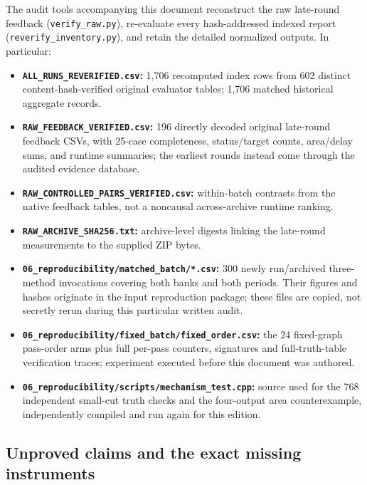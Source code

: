 The audit tools accompanying this document reconstruct the raw late-round feedback (\texttt{verify\_raw.py}), re-evaluate every hash-addressed indexed report (\texttt{reverify\_inventory.py}), and retain the detailed normalized outputs. In particular:

\begin{itemize}
\tightlist
\item
  \textbf{\texttt{ALL\_RUNS\_REVERIFIED.csv}:} 1,706 recomputed index rows from 602 distinct content-hash-verified original evaluator tables; 1,706 matched historical aggregate records.
\item
  \textbf{\texttt{RAW\_FEEDBACK\_VERIFIED.csv}:} 196 directly decoded original late-round feedback CSVs, with 25-case completeness, status/target counts, area/delay sums, and runtime summaries; the earliest rounds instead come through the audited evidence database.
\item
  \textbf{\texttt{RAW\_CONTROLLED\_PAIRS\_VERIFIED.csv}:} within-batch contrasts from the native feedback tables, not a noncausal across-archive runtime ranking.
\item
  \textbf{\texttt{RAW\_ARCHIVE\_SHA256.txt}:} archive-level digests linking the late-round measurements to the supplied ZIP bytes.
\item
  \textbf{\texttt{06\_reproducibility/matched\_batch/*.csv}:} 300 newly run/archived three-method invocations covering both banks and both periods. Their figures and hashes originate in the input reproduction package; these files are copied, not secretly rerun during this particular written audit.
\item
  \textbf{\texttt{06\_reproducibility/fixed\_batch/fixed\_order.csv}:} the 24 fixed-graph pass-order arms plus full per-pass counters, signatures and full-truth-table verification traces; experiment executed before this document was authored.
\item
  \textbf{\texttt{06\_reproducibility/scripts/mechanism\_test.cpp}:} source used for the 768 independent small-cut truth checks and the four-output area counterexample, independently compiled and run again for this edition.
\end{itemize}

\subsection{Unproved claims and the exact missing instruments}\label{unproved-claims-and-the-exact-missing-instruments}

